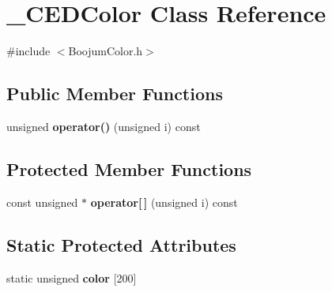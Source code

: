 \section{\-\_\-\-C\-E\-D\-Color Class Reference}
\label{class__CEDColor}


{\ttfamily \#include $<$Boojum\-Color.\-h$>$}

\subsection*{Public Member Functions}
\begin{DoxyCompactItemize}
\item 
unsigned {\bfseries operator()} (unsigned i) const \label{class__CEDColor_aa3bb07cf0ec077bc68091e7b256ee15b}

\end{DoxyCompactItemize}
\subsection*{Protected Member Functions}
\begin{DoxyCompactItemize}
\item 
const unsigned $\ast$ {\bfseries operator[$\,$]} (unsigned i) const \label{class__CEDColor_a9db09073180491e12f5b5d6176c44fc2}

\end{DoxyCompactItemize}
\subsection*{Static Protected Attributes}
\begin{DoxyCompactItemize}
\item 
static unsigned {\bfseries color} [200]\label{class__CEDColor_a72bc64cba8ad444d41fcd827108f6e14}

\end{DoxyCompactItemize}


